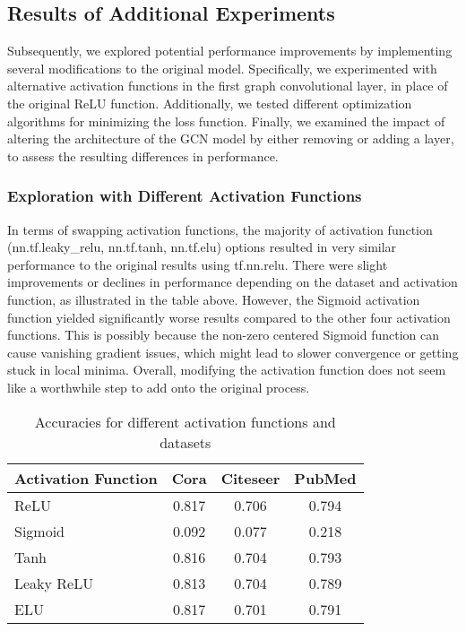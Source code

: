 \documentclass[11pt,a4paper]{article}
\begin{document}
\subsection{Results of Additional Experiments}

Subsequently, we explored potential performance improvements by implementing several modifications to the original model. Specifically, we experimented with alternative activation functions in the first graph convolutional layer, in place of the original ReLU function. Additionally, we tested different optimization algorithms for minimizing the loss function. Finally, we examined the impact of altering the architecture of the GCN model by either removing or adding a layer, to assess the resulting differences in performance.

\subsubsection{Exploration with Different Activation Functions}

In terms of swapping activation functions, the majority of activation function (nn.tf.leaky\_relu, nn.tf.tanh, nn.tf.elu) options resulted in very similar performance to the original results using tf.nn.relu. There were slight improvements or declines in performance depending on the dataset and activation function, as illustrated in the table above. However, the Sigmoid activation function yielded significantly worse results compared to the other four activation functions. This is possibly because the non-zero centered Sigmoid function can cause vanishing gradient issues, which might lead to slower convergence or getting stuck in local minima. Overall, modifying the activation function does not seem like a worthwhile step to add onto the original process.

\begin{table}[h]
  \centering
  \begin{tabular}{p{2cm}|c|c|c}
  \textbf{Activation Function} & \textbf{Cora} & \textbf{Citeseer} & \textbf{PubMed} \\ \hline
  ReLU        & 0.817 & 0.706 & 0.794 \\
  Sigmoid     & 0.092 & 0.077 & 0.218 \\
  Tanh        & 0.816 & 0.704 & 0.793 \\
  Leaky ReLU  & 0.813 & 0.704 & 0.789 \\
  ELU         & 0.817 & 0.701 & 0.791
  \end{tabular}
  \caption{Accuracies for different activation functions and datasets}
  \label{table:activation-functions}
\end{table}
\end{document}
